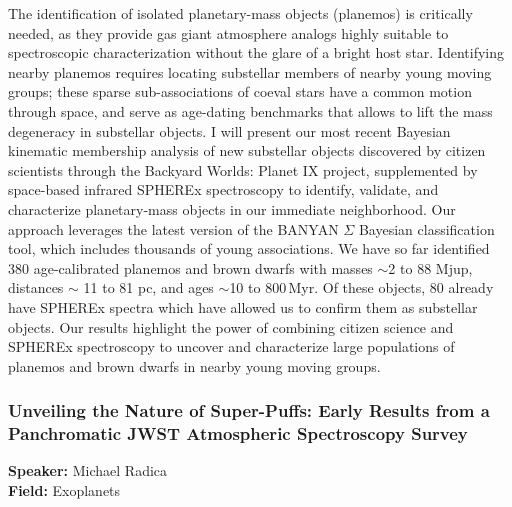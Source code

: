 The identification of isolated planetary-mass objects (planemos) is critically needed, as they provide gas giant atmosphere analogs highly suitable to spectroscopic characterization without the glare of a bright host star. Identifying nearby planemos requires locating substellar members of nearby young moving groups; these sparse sub-associations of coeval stars have a common motion through space, and serve as age-dating benchmarks that allows to lift the mass degeneracy in substellar objects. I will present our most recent Bayesian kinematic membership analysis of new substellar objects discovered by citizen scientists through the Backyard Worlds: Planet IX project, supplemented by space-based infrared SPHEREx spectroscopy to identify, validate, and characterize planetary-mass objects in our immediate neighborhood. Our approach leverages the latest version of the BANYAN $\Sigma$ Bayesian classification tool, which includes thousands of young associations. We have so far identified 380 age-calibrated planemos and brown dwarfs with masses $\sim$2 to 88 Mjup, distances $\sim$ 11 to 81 pc, and ages $\sim$10 to 800\,Myr. Of these objects, 80 already have SPHEREx spectra which have allowed us to confirm them as substellar objects. Our results highlight the power of combining citizen science and SPHEREx spectroscopy to uncover and characterize large populations of planemos and brown dwarfs in nearby young moving groups.

\hypertarget{abstract-talk-2}{}\label{abstract-page-talk-2}
\subsubsection*{Unveiling the Nature of Super-Puffs: Early Results from a Panchromatic JWST Atmospheric Spectroscopy Survey}
\textbf{Speaker:} Michael Radica\\
\textbf{Field:} Exoplanets


